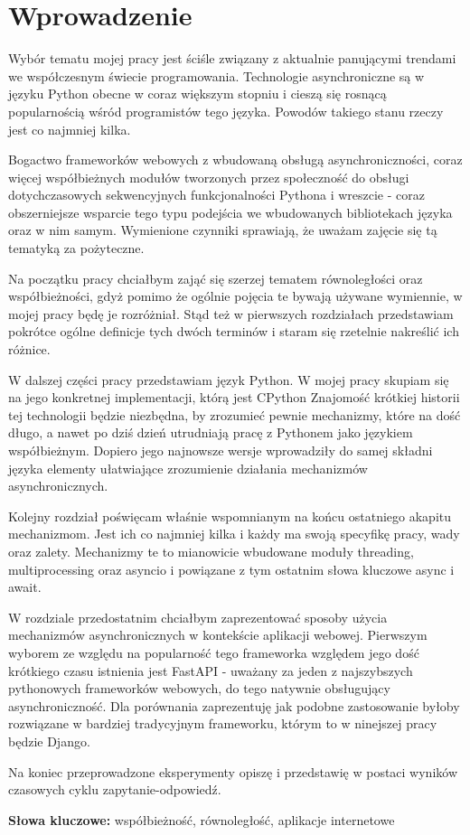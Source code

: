 \chapter{Wprowadzenie}

Wybór tematu mojej pracy jest ściśle związany z aktualnie panującymi trendami we współczesnym świecie programowania. Technologie asynchroniczne są w języku Python obecne w coraz większym stopniu i cieszą się rosnącą popularnością wśród programistów tego języka. Powodów takiego stanu rzeczy jest co najmniej kilka. 

Bogactwo frameworków webowych z wbudowaną obsługą asynchroniczności, coraz więcej współbieżnych modułów tworzonych przez społeczność do obsługi dotychczasowych sekwencyjnych funkcjonalności Pythona i wreszcie - coraz obszerniejsze wsparcie tego typu podejścia we wbudowanych bibliotekach języka oraz  w nim samym. Wymienione czynniki sprawiają, że uważam zajęcie się tą tematyką za pożyteczne.

Na początku pracy chciałbym zająć się szerzej tematem równoległości oraz współbieżności, gdyż pomimo że ogólnie pojęcia te bywają używane wymiennie, w mojej pracy będę je rozróżniał. Stąd też w pierwszych rozdziałach przedstawiam pokrótce ogólne definicje tych dwóch terminów i staram się rzetelnie nakreślić ich różnice.

W dalszej części pracy przedstawiam język Python. W mojej pracy skupiam się na jego konkretnej implementacji, którą jest CPython Znajomość krótkiej historii tej technologii będzie niezbędna, by zrozumieć pewnie mechanizmy, które na dość długo, a nawet po dziś dzień utrudniają pracę z Pythonem jako językiem współbieżnym. Dopiero jego najnowsze wersje wprowadziły do samej składni języka elementy ułatwiające zrozumienie działania mechanizmów asynchronicznych.

Kolejny rozdział poświęcam właśnie wspomnianym na końcu ostatniego akapitu mechanizmom. Jest ich co najmniej kilka i każdy ma swoją specyfikę pracy, wady oraz zalety. Mechanizmy te to mianowicie wbudowane moduły threading, multiprocessing oraz asyncio i powiązane z tym ostatnim słowa kluczowe async i await.

W rozdziale przedostatnim chciałbym zaprezentować sposoby użycia mechanizmów asynchronicznych w kontekście aplikacji webowej. Pierwszym wyborem ze względu na popularność tego frameworka względem jego dość krótkiego czasu istnienia jest FastAPI - uważany za jeden z najszybszych pythonowych frameworków webowych, do tego natywnie obsługujący asynchroniczność. Dla porównania zaprezentuję jak podobne zastosowanie byłoby rozwiązane w bardziej tradycyjnym frameworku, którym to w ninejszej pracy będzie Django.

Na koniec przeprowadzone eksperymenty opiszę i przedstawię w postaci wyników czasowych cyklu zapytanie-odpowiedź.

\textbf{Słowa kluczowe:} współbieżność, równoległość, aplikacje internetowe